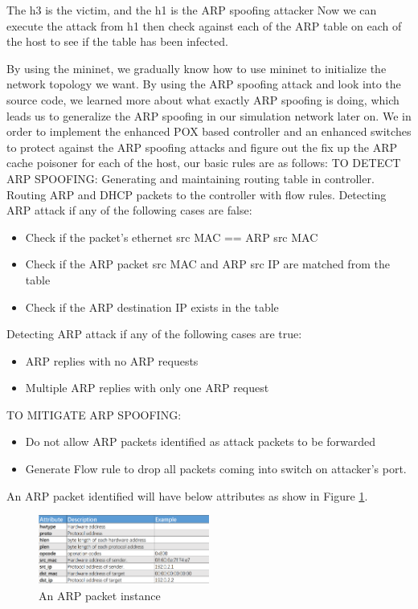 \documentclass[conference]{IEEEtran}
\begin{document}
The h3 is the victim, and the h1 is the ARP spoofing attacker 
Now we can execute the attack from h1 then check against each of the ARP table on each of the host to see if the table has been infected. \newline

By using the mininet, we gradually know how to use mininet to initialize the network topology we want. By using the ARP spoofing attack and look into the source code, we learned more about what exactly ARP spoofing is doing, which leads us to generalize the ARP spoofing in our simulation network later on. We in order to implement the enhanced POX based controller and an enhanced switches to protect against the ARP spoofing attacks and figure out the fix up the ARP cache poisoner for each of the host, our basic rules are as follows:\newline
TO DETECT ARP SPOOFING:\newline
Generating and maintaining routing table in controller.\newline
Routing ARP and DHCP packets to the controller with flow rules.\newline
Detecting ARP attack if any of the following cases are false:
\begin{itemize}
\item Check if the packet’s ethernet src MAC == ARP src MAC
\item Check if the ARP packet src MAC and ARP src IP are matched from the table
\item Check if the ARP destination IP exists in the table
\end{itemize}
Detecting ARP attack if any of the following cases are true:
\begin{itemize}
\item ARP replies with no ARP requests
\item Multiple ARP replies with only one ARP request
\end{itemize}
TO MITIGATE ARP SPOOFING:
\begin{itemize}
\item Do not allow ARP packets identified as attack packets to be forwarded
\item Generate Flow rule to drop all packets coming into switch on attacker’s port.
\end{itemize}

An ARP packet identified will have below attributes as show in Figure \ref{fig:ARPPacket}.

\begin{figure}[h!]
\includegraphics[width=0.5\textwidth]{Figure_2.png}
\caption{An ARP packet instance}
\label{fig:ARPPacket}
\end{figure}
\end{document}

